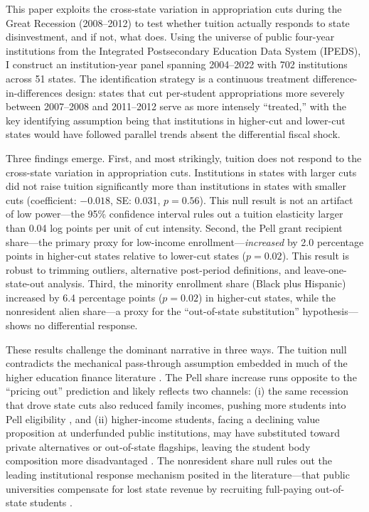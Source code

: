 \documentclass[12pt]{article}
\begin{document}
This paper exploits the cross-state variation in appropriation cuts during the Great Recession (2008--2012) to test whether tuition actually responds to state disinvestment, and if not, what does. Using the universe of public four-year institutions from the Integrated Postsecondary Education Data System (IPEDS), I construct an institution-year panel spanning 2004--2022 with 702 institutions across 51 states. The identification strategy is a continuous treatment difference-in-differences design: states that cut per-student appropriations more severely between 2007--2008 and 2011--2012 serve as more intensely ``treated,'' with the key identifying assumption being that institutions in higher-cut and lower-cut states would have followed parallel trends absent the differential fiscal shock.

Three findings emerge. First, and most strikingly, tuition does not respond to the cross-state variation in appropriation cuts. Institutions in states with larger cuts did not raise tuition significantly more than institutions in states with smaller cuts (coefficient: $-0.018$, SE: 0.031, $p = 0.56$). This null result is not an artifact of low power---the 95\% confidence interval rules out a tuition elasticity larger than 0.04 log points per unit of cut intensity. Second, the Pell grant recipient share---the primary proxy for low-income enrollment---\textit{increased} by 2.0 percentage points in higher-cut states relative to lower-cut states ($p = 0.02$). This result is robust to trimming outliers, alternative post-period definitions, and leave-one-state-out analysis. Third, the minority enrollment share (Black plus Hispanic) increased by 6.4 percentage points ($p = 0.02$) in higher-cut states, while the nonresident alien share---a proxy for the ``out-of-state substitution'' hypothesis---shows no differential response.

These results challenge the dominant narrative in three ways. The tuition null contradicts the mechanical pass-through assumption embedded in much of the higher education finance literature \citep{bound2007cohort}. The Pell share increase runs opposite to the ``pricing out'' prediction and likely reflects two channels: (i) the same recession that drove state cuts also reduced family incomes, pushing more students into Pell eligibility \citep{baum2013trends}, and (ii) higher-income students, facing a declining value proposition at underfunded public institutions, may have substituted toward private alternatives or out-of-state flagships, leaving the student body composition more disadvantaged \citep{hoxby2009changing}. The nonresident share null rules out the leading institutional response mechanism posited in the literature---that public universities compensate for lost state revenue by recruiting full-paying out-of-state students \citep{jaquette2017state, bound2020public}.
\end{document}
